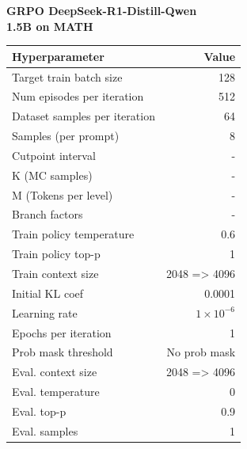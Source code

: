 \begin{minipage}[t]{0.48\textwidth}
    \centering
    \textbf{GRPO DeepSeek-R1-Distill-Qwen \\ 1.5B on MATH}\\[4pt]
    \begin{tabular}{@{}lr@{}}
        \toprule
        Hyperparameter & Value \\ \midrule
        Target train batch size & 128 \\ 
        Num episodes per iteration & 512 \\ 
        Dataset samples per iteration & 64 \\
        Samples (per prompt) & 8 \\
        Cutpoint interval & - \\
        K (MC samples) & - \\
        M (Tokens per level) & - \\
        Branch factors & - \\
        Train policy temperature & 0.6 \\
        Train policy top-p & 1 \\
        Train context size & 2048 => 4096 \\
        Initial KL coef & 0.0001 \\
        Learning rate & $1\times10^{-6}$ \\
        Epochs per iteration & 1 \\
        Prob mask threshold & No prob mask \\
        Eval. context size & 2048 => 4096 \\
        Eval. temperature & 0 \\
        Eval. top-p & 0.9 \\
        Eval. samples & 1 \\
        \bottomrule
    \end{tabular}
\end{minipage}\hfill

